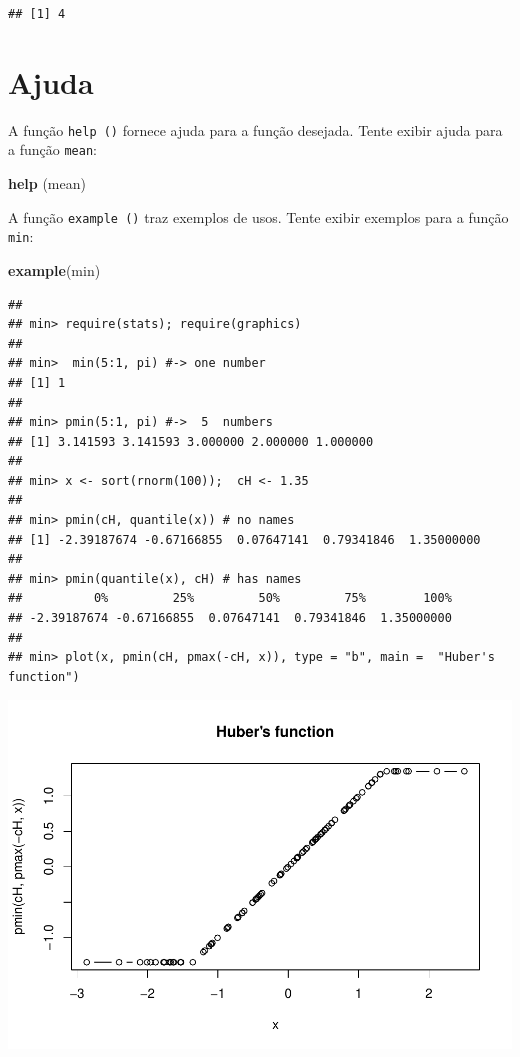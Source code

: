 \documentclass[
]{book}
\newenvironment{Shaded}{\begin{snugshade}}{\end{snugshade}}
\newcommand{\KeywordTok}[1]{\textcolor[rgb]{0.13,0.29,0.53}{\textbf{#1}}}
\newcommand{\NormalTok}[1]{#1}
\begin{document}
\begin{verbatim}
## [1] 4
\end{verbatim}

\hypertarget{ajuda}{%
\section{Ajuda}\label{ajuda}}

A função \texttt{help\ ()} fornece ajuda para a função desejada. Tente exibir ajuda para a função \texttt{mean}:

\begin{Shaded}
\begin{Highlighting}[]
\KeywordTok{help}\NormalTok{ (mean)}
\end{Highlighting}
\end{Shaded}

A função \texttt{example\ ()} traz exemplos de usos. Tente exibir exemplos para a função \texttt{min}:

\begin{Shaded}
\begin{Highlighting}[]
\KeywordTok{example}\NormalTok{(min)}
\end{Highlighting}
\end{Shaded}

\begin{verbatim}
## 
## min> require(stats); require(graphics)
## 
## min>  min(5:1, pi) #-> one number
## [1] 1
## 
## min> pmin(5:1, pi) #->  5  numbers
## [1] 3.141593 3.141593 3.000000 2.000000 1.000000
## 
## min> x <- sort(rnorm(100));  cH <- 1.35
## 
## min> pmin(cH, quantile(x)) # no names
## [1] -2.39187674 -0.67166855  0.07647141  0.79341846  1.35000000
## 
## min> pmin(quantile(x), cH) # has names
##          0%         25%         50%         75%        100% 
## -2.39187674 -0.67166855  0.07647141  0.79341846  1.35000000 
## 
## min> plot(x, pmin(cH, pmax(-cH, x)), type = "b", main =  "Huber's function")
\end{verbatim}

\includegraphics{TudodoR_files/figure-latex/unnamed-chunk-14-1.pdf}
\end{document}
